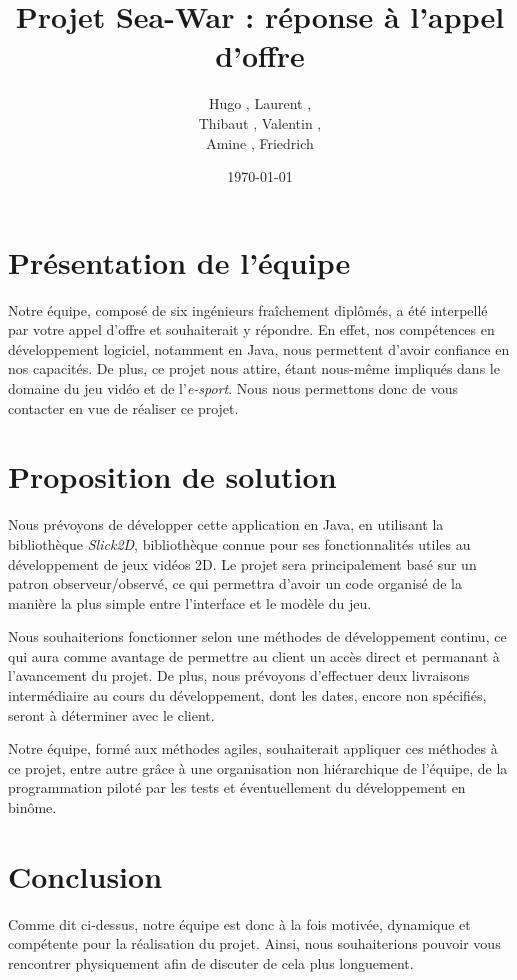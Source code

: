 \documentclass{article}
\title{Projet Sea-War : réponse à l'appel d'offre}
\author{Hugo \bsc{Ayats}, Laurent \bsc{Pichollet},\\ Thibaut \bsc{Lausecker}, Valentin \bsc{Louveau},\\ Amine \bsc{Abdellaoui}, Friedrich \bsc{Gonda}}
\date{\today}
\begin{document}
\maketitle

\section*{Présentation de l'équipe}

Notre équipe, composé de six ingénieurs fraîchement diplômés, a été interpellé par votre appel d'offre et souhaiterait y répondre. En effet, nos compétences en développement logiciel, notamment en Java, nous permettent d'avoir confiance en nos capacités. De plus, ce projet nous attire, étant nous-même impliqués dans le domaine du jeu vidéo et de l'\textit{e-sport}. Nous nous permettons donc de vous contacter en vue de réaliser ce projet.



\section*{Proposition de solution}

Nous prévoyons de développer cette application en Java, en utilisant la bibliothèque \textit{Slick2D}, bibliothèque connue pour ses fonctionnalités utiles au développement de jeux vidéos 2D. Le projet sera principalement basé sur un patron observeur/observé, ce qui permettra d'avoir un code organisé de la manière la plus simple entre l'interface et le modèle du jeu. 

Nous souhaiterions fonctionner selon une méthodes de développement continu, ce qui aura comme avantage de permettre au client un accès direct et permanant à l'avancement du projet. De plus, nous prévoyons d'effectuer deux livraisons intermédiaire au cours du développement, dont les dates, encore non spécifiés, seront à déterminer avec le client.

Notre équipe, formé aux méthodes agiles, souhaiterait appliquer ces méthodes à ce projet, entre autre grâce à une organisation non hiérarchique de l'équipe, de la programmation piloté par les tests et éventuellement du développement en binôme.

\section*{Conclusion}

Comme dit ci-dessus, notre équipe est donc à la fois motivée, dynamique et compétente pour la réalisation du projet. Ainsi, nous souhaiterions pouvoir vous rencontrer physiquement afin de discuter de cela plus longuement.
\end{document}
